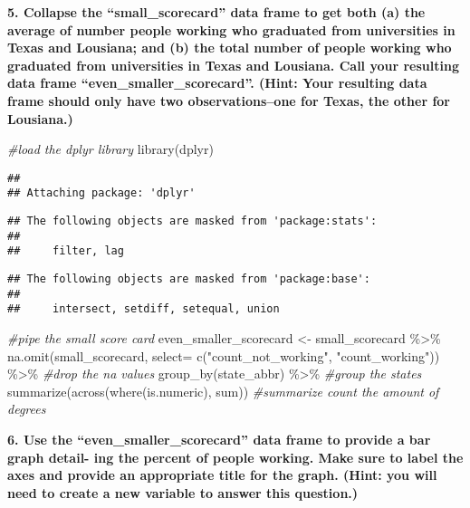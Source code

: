 \documentclass[
]{article}
\newenvironment{Shaded}{\begin{snugshade}}{\end{snugshade}}
\newcommand{\AttributeTok}[1]{\textcolor[rgb]{0.77,0.63,0.00}{#1}}
\newcommand{\CommentTok}[1]{\textcolor[rgb]{0.56,0.35,0.01}{\textit{#1}}}
\newcommand{\FunctionTok}[1]{\textcolor[rgb]{0.00,0.00,0.00}{#1}}
\newcommand{\NormalTok}[1]{#1}
\newcommand{\OtherTok}[1]{\textcolor[rgb]{0.56,0.35,0.01}{#1}}
\newcommand{\SpecialCharTok}[1]{\textcolor[rgb]{0.00,0.00,0.00}{#1}}
\newcommand{\StringTok}[1]{\textcolor[rgb]{0.31,0.60,0.02}{#1}}
\begin{document}
\textbf{5. Collapse the ``small\_scorecard'' data frame to get both (a)
the average of number people working who graduated from universities in
Texas and Lousiana; and (b) the total number of people working who
graduated from universities in Texas and Lousiana. Call your resulting
data frame ``even\_smaller\_scorecard''. (Hint: Your resulting data
frame should only have two observations--one for Texas, the other for
Lousiana.)}

\begin{Shaded}
\begin{Highlighting}[]
\CommentTok{\#load the dplyr library}
\FunctionTok{library}\NormalTok{(dplyr)}
\end{Highlighting}
\end{Shaded}

\begin{verbatim}
## 
## Attaching package: 'dplyr'
\end{verbatim}

\begin{verbatim}
## The following objects are masked from 'package:stats':
## 
##     filter, lag
\end{verbatim}

\begin{verbatim}
## The following objects are masked from 'package:base':
## 
##     intersect, setdiff, setequal, union
\end{verbatim}

\begin{Shaded}
\begin{Highlighting}[]
\CommentTok{\#pipe the small score card}
\NormalTok{even\_smaller\_scorecard }\OtherTok{\textless{}{-}}\NormalTok{  small\_scorecard }\SpecialCharTok{\%\textgreater{}\%} 
  \FunctionTok{na.omit}\NormalTok{(small\_scorecard, }\AttributeTok{select=} \FunctionTok{c}\NormalTok{(}\StringTok{"count\_not\_working"}\NormalTok{, }\StringTok{"count\_working"}\NormalTok{)) }\SpecialCharTok{\%\textgreater{}\%} \CommentTok{\#drop the na values}
  \FunctionTok{group\_by}\NormalTok{(state\_abbr) }\SpecialCharTok{\%\textgreater{}\%} \CommentTok{\#group the states }
  \FunctionTok{summarize}\NormalTok{(}\FunctionTok{across}\NormalTok{(}\FunctionTok{where}\NormalTok{(is.numeric), sum)) }\CommentTok{\#summarize count the amount of degrees}
\end{Highlighting}
\end{Shaded}

\textbf{6. Use the ``even\_smaller\_scorecard'' data frame to provide a
bar graph detail- ing the percent of people working. Make sure to label
the axes and provide an appropriate title for the graph. (Hint: you will
need to create a new variable to answer this question.)}
\end{document}
